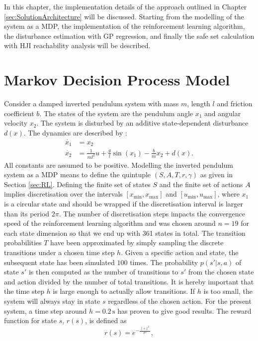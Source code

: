 \documentclass[../main.tex]{subfiles}
\begin{document}
In this chapter, the implementation details of the approach outlined in Chapter \ref{sec:SolutionArchitecture} will be discussed. Starting from the modelling of the system as a MDP, the implementation of the reinforcement learning algorithm, the disturbance estimation with GP regression, and finally the safe set calculation with HJI reachability analysis will be described.
\section{Markov Decision Process Model}\label{sec:implementation_MDP}
Consider a damped inverted pendulum system with mass $m$, length $l$ and friction coefficient $b$. The states of the system are the pendulum angle $x_1$ and angular velocity $x_2$. The system is disturbed by an additive state-dependent disturbance $d(x)$. The dynamics are described by \cite{doya2000reinforcement}:
\begin{align}
    \dot{x_1} &= x_2\\
    \dot{x_2} &= \frac{1}{ml^2}u+\frac{g}{l}\sin(x_1)-\frac{b}{m}x_2+d(x).
\end{align}
All constants are assumed to be positive. 
Modelling the inverted pendulum system as a MDP means to define the quintuple $(S,A,T,r,\gamma)$ as given in Section \ref{sec:RL}. Defining the finite set of states $S$ and the finite set of actions $A$ implies discretisation over the intervals $[x_{\min}, x_{\max}]$ and $[u_{\min}, u_{\max}]$, where $x_1$ is a circular state and should be wrapped if the discretisation interval is larger than its period $2\pi$. The number of discretisation  steps impacts the convergence speed of the reinforcement learning algorithm and was chosen around $n = 19$ for each state dimension so that we end up with 361 states in total.
The transition probabilities $T$ have been approximated by simply sampling the discrete transitions under a chosen time step $h$. Given a specific action and state, the subsequent state has been simulated $100$ times. The probability $p(s'|s,a)$ of state $s'$ is then computed as the number of transitions to $s'$ from the chosen state and action divided by the number of total transitions. It is hereby important that the time step $h$ is large enough to actually allow transitions. If $h$ is too small, the system will always stay in state $s$ regardless of the chosen action. For the present system, a time step around $h = 0.2\,\text{s}$ has proven to give good results. The reward function for state $s$, $r(s)$, is defined as
\begin{equation}
    r(s) = e^{-\frac{\|s\|^2}{\sigma^2}},
\end{equation}
\end{document}
